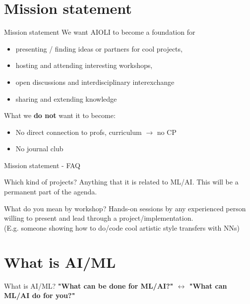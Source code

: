 \documentclass[aspectratio=169]{beamer}
\begin{document}
\section{Mission statement}
	\begin{frame}{Mission statement}
		We want AIOLI to become a foundation for
		\begin{itemize}
			\item presenting / finding ideas or partners for cool projects,
			\item hosting and attending interesting workshops,
			\item open discussions and interdisciplinary interexchange
			\item sharing and extending knowledge
		\end{itemize}
		\vfill
		What we \textbf{do not} want it to become:
		\begin{itemize}
			\item No direct connection to profs, curriculum $\rightarrow$ no CP
			\item No journal club
		\end{itemize}
	\end{frame}

	\begin{frame}{Mission statement - FAQ}
		\begin{block}{Which kind of projects?}
			Anything that it is related to ML/AI. This will be a permanent part of the agenda.
		\end{block}

		\bigskip

		\begin{block}{What do you mean by workshop?}
			Hands-on sessions by any experienced person willing to present and lead through a project/implementation. \\
			(E.g. someone showing how to do/code cool artistic style transfers with NNs) 
		\end{block}

	\end{frame}

\section{What is AI/ML}
	\begin{frame}{What is AI/ML?}
		\centering \textbf{"What can be done for ML/AI?" $\longleftrightarrow$ "What can ML/AI do for you?"}
	\end{frame}
	
\end{document}
